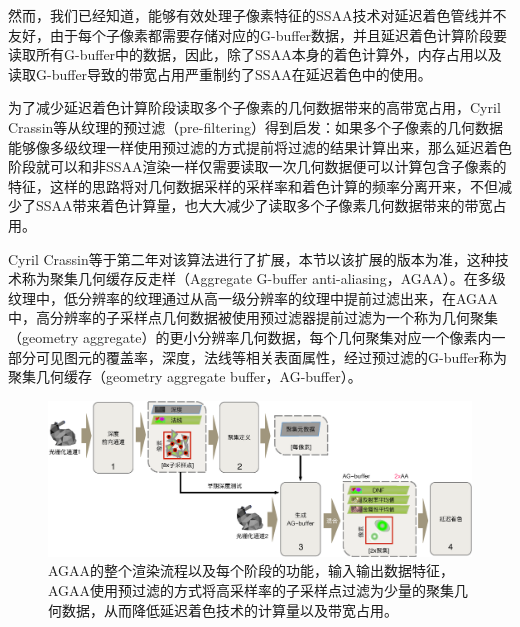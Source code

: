 然而，我们已经知道，能够有效处理子像素特征的SSAA技术对延迟着色管线并不友好，由于每个子像素都需要存储对应的G-buffer数据，并且延迟着色计算阶段要读取所有G-buffer中的数据，因此，除了SSAA本身的着色计算外，内存占用以及读取G-buffer导致的带宽占用严重制约了SSAA在延迟着色中的使用。

为了减少延迟着色计算阶段读取多个子像素的几何数据带来的高带宽占用，Cyril Crassin\cite{a:AggregateG-BufferAnti-Aliasing}等从纹理的预过滤（pre-filtering）得到启发：如果多个子像素的几何数据能够像多级纹理一样使用预过滤的方式提前将过滤的结果计算出来，那么延迟着色阶段就可以和非SSAA渲染一样仅需要读取一次几何数据便可以计算包含子像素的特征，这样的思路将对几何数据采样的采样率和着色计算的频率分离开来，不但减少了SSAA带来着色计算量，也大大减少了读取多个子像素几何数据带来的带宽占用。

Cyril Crassin等于第二年\cite{a:AggregateG-BufferAnti-Aliasing-ExtendedVersion-}对该算法进行了扩展，本节以该扩展的版本为准，这种技术称为聚集几何缓存反走样（Aggregate G-buffer anti-aliasing，AGAA）。在多级纹理中，低分辨率的纹理通过从高一级分辨率的纹理中提前过滤出来，在AGAA中，高分辨率的子采样点几何数据被使用预过滤器提前过滤为一个称为几何聚集（geometry aggregate）的更小分辨率几何数据，每个几何聚集对应一个像素内一部分可见图元的覆盖率，深度，法线等相关表面属性，经过预过滤的G-buffer称为聚集几何缓存（geometry aggregate buffer，AG-buffer）。

\begin{figure}
\begin{fullwidth}
	\includegraphics[width=1.\thewidth]{figures/shade/agaa}		
	\caption{AGAA的整个渲染流程以及每个阶段的功能，输入输出数据特征，AGAA使用预过滤的方式将高采样率的子采样点过滤为少量的聚集几何数据，从而降低延迟着色技术的计算量以及带宽占用。}
	\label{f:shade-agaa}
\end{fullwidth}
\end{figure}

